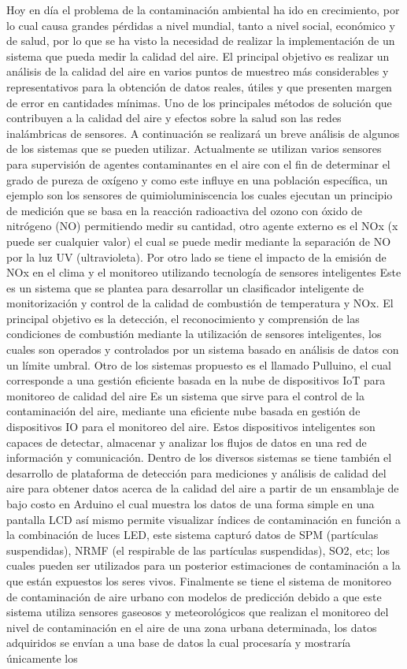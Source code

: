 \documentclass[10pt,a4paper]{article}
\begin{document}
Hoy en día el problema de la contaminación ambiental ha ido en crecimiento, por lo cual causa grandes pérdidas  a nivel mundial, tanto a nivel social, económico y de salud, por lo que se ha visto la necesidad de realizar la implementación de un sistema que pueda medir la calidad del aire. El principal objetivo es realizar un análisis de la calidad del aire en varios puntos de muestreo más considerables y representativos para la obtención de datos reales, útiles y que presenten margen de error en cantidades mínimas. Uno de los principales métodos de solución que contribuyen a la calidad del aire y efectos sobre la salud son las redes inalámbricas de sensores. A continuación se realizará un breve análisis de algunos de los sistemas que se pueden utilizar. Actualmente se utilizan varios sensores para supervisión de agentes contaminantes en el aire con el fin de determinar el grado de pureza de oxígeno y como este influye en una población específica, un ejemplo son los sensores de quimioluminiscencia los cuales ejecutan un principio de medición que se basa en la reacción radioactiva del ozono con óxido de nitrógeno (NO) permitiendo medir su cantidad, otro agente externo es el NOx (x puede ser cualquier valor) el cual se puede medir mediante la separación de NO por la luz UV (ultravioleta). Por otro lado se tiene el impacto de la emisión de NOx en el clima y el monitoreo utilizando tecnología de sensores inteligentes Este es un sistema que se plantea para desarrollar un clasificador inteligente de monitorización y control de la calidad de combustión de temperatura y NOx. El principal objetivo es la detección, el reconocimiento y comprensión de las condiciones de combustión mediante la utilización de sensores inteligentes, los cuales son operados y controlados por un sistema basado en análisis de datos con un límite umbral. Otro de los sistemas propuesto es el llamado Pulluino, el cual corresponde a una gestión eficiente basada en la nube de dispositivos IoT para monitoreo de calidad del aire Es un sistema que sirve para el control de la contaminación del aire, mediante una eficiente nube basada en gestión de dispositivos IO para el monitoreo del aire. Estos dispositivos inteligentes son capaces de detectar, almacenar y analizar los flujos de datos en una red de información y comunicación. Dentro de los diversos sistemas se tiene también el desarrollo de plataforma de detección para mediciones y análisis de calidad del aire para obtener datos acerca de la calidad del aire a partir de un ensamblaje de bajo costo en Arduino el cual muestra los datos de una forma simple en una pantalla LCD así mismo permite visualizar índices de contaminación en función a la combinación de luces LED, este sistema capturó datos de SPM (partículas suspendidas), NRMF (el respirable de las partículas suspendidas), SO2, etc; los cuales pueden ser utilizados para un posterior estimaciones de contaminación a la que están expuestos los seres vivos. Finalmente se tiene el sistema de monitoreo de contaminación de aire urbano con modelos de predicción debido a que este sistema utiliza sensores gaseosos y meteorológicos que realizan el monitoreo del nivel de contaminación en el aire de una zona urbana determinada, los datos adquiridos se envían a una base de datos la cual procesaría y mostraría únicamente los 
\end{document}
